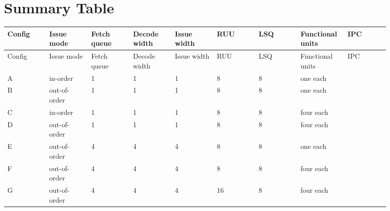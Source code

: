 \documentclass[11pt]{article}
\begin{document}
\section{Summary Table}
\begin{center}
\scriptsize
\begin{longtable}{|p{0.10\linewidth}|p{0.10\linewidth}|p{0.10\linewidth}|p{0.10\linewidth}|p{0.10\linewidth}|p{0.10\linewidth}|p{0.10\linewidth}|p{0.10\linewidth}|p{0.10\linewidth}|}
\hline
Config & Issue mode & Fetch queue & Decode width & Issue width & RUU & LSQ & Functional units & IPC \\
\hline
\endfirsthead
\hline
Config & Issue mode & Fetch queue & Decode width & Issue width & RUU & LSQ & Functional units & IPC \\
\hline
\endhead
A & in-order & 1 & 1 & 1 & 8 & 8 & one each &  \\
\hline
B & out-of-order & 1 & 1 & 1 & 8 & 8 & one each &  \\
\hline
C & in-order & 1 & 1 & 1 & 8 & 8 & four each &  \\
\hline
D & out-of-order & 1 & 1 & 1 & 8 & 8 & four each &  \\
\hline
E & out-of-order & 4 & 4 & 4 & 8 & 8 & one each &  \\
\hline
F & out-of-order & 4 & 4 & 4 & 8 & 8 & four each &  \\
\hline
G & out-of-order & 4 & 4 & 4 & 16 & 8 & four each &  \\
\hline
\end{longtable}
\normalsize
\end{center}
\end{document}
